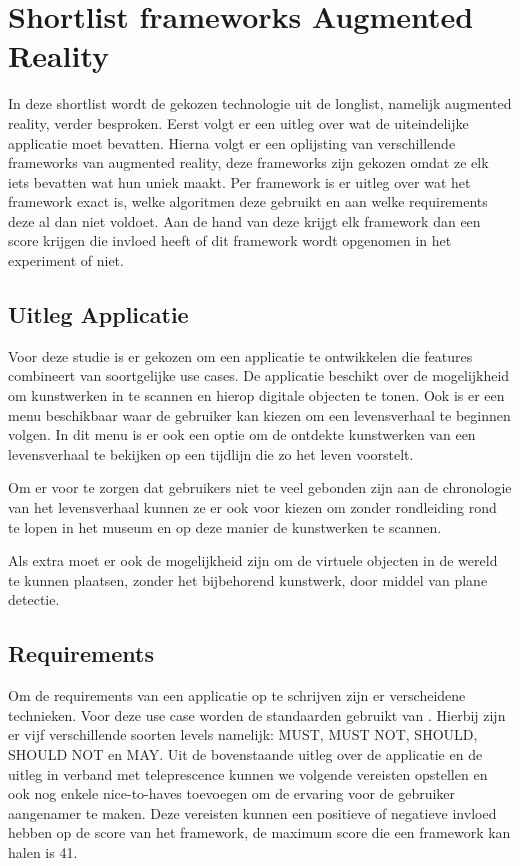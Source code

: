 \chapter{Shortlist frameworks Augmented Reality}
\label{ch:shortlist}

In deze shortlist wordt de gekozen technologie uit de longlist, namelijk augmented reality, verder besproken.
Eerst volgt er een uitleg over wat de uiteindelijke applicatie moet bevatten.
Hierna volgt er een oplijsting van verschillende frameworks van augmented reality, deze frameworks zijn gekozen omdat ze elk iets bevatten wat hun uniek maakt. Per framework is er uitleg over wat het framework exact is, welke algoritmen deze gebruikt en aan welke requirements deze al dan niet voldoet. Aan de hand van deze krijgt elk framework dan een score krijgen die invloed heeft of dit framework wordt opgenomen in het experiment of niet.

\section{Uitleg Applicatie}
Voor deze studie is er gekozen om een applicatie te ontwikkelen die features combineert van soortgelijke use cases. De applicatie beschikt over de mogelijkheid om kunstwerken in te scannen en hierop digitale objecten te tonen. Ook is er een menu beschikbaar waar de gebruiker kan kiezen om een levensverhaal te beginnen volgen. In dit menu is er ook een optie om de ontdekte kunstwerken van een levensverhaal te bekijken op een tijdlijn die zo het leven voorstelt.

Om er voor te zorgen dat gebruikers niet te veel gebonden zijn aan de chronologie van het levensverhaal kunnen ze er ook voor kiezen om zonder rondleiding rond te lopen in het museum en op deze manier de kunstwerken te scannen.

Als extra moet er ook de mogelijkheid zijn om de virtuele objecten in de wereld te kunnen plaatsen, zonder het bijbehorend kunstwerk, door middel van plane detectie.

\section{Requirements}
Om de requirements van een applicatie op te schrijven zijn er verscheidene technieken. Voor deze use case worden de standaarden gebruikt van \textcite{Bradner1997}. Hierbij zijn er vijf verschillende soorten levels namelijk: MUST, MUST NOT, SHOULD, SHOULD NOT en MAY. Uit de bovenstaande uitleg over de applicatie en de uitleg in verband met teleprescence kunnen we volgende vereisten opstellen en ook nog enkele nice-to-haves toevoegen om de ervaring voor de gebruiker aangenamer te maken. Deze vereisten kunnen een positieve of negatieve invloed hebben op de score van het framework, de maximum score die een framework kan halen is 41.

